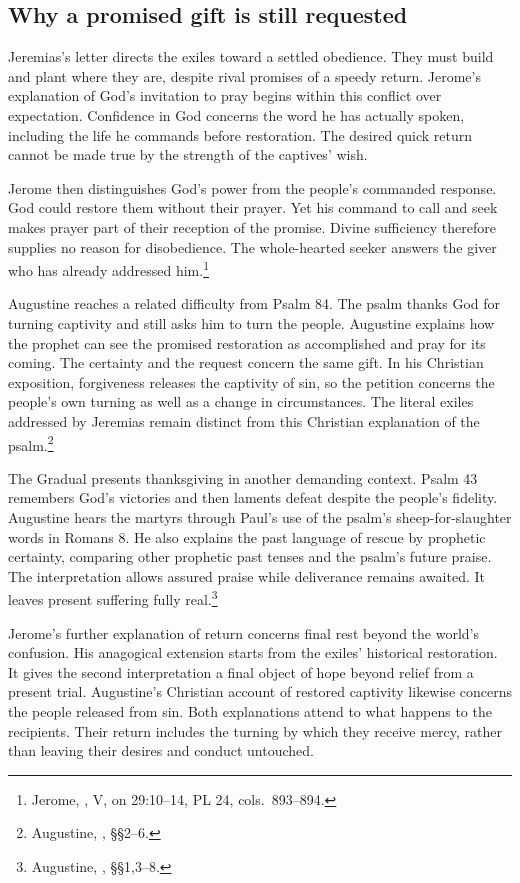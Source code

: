 \subsection{Why a promised gift is still requested}
Jeremias's letter directs the exiles toward a settled obedience.
They must build and plant where they are, despite rival promises
of a speedy return. Jerome's explanation of God's invitation to
pray begins within this conflict over expectation. Confidence in
God concerns the word he has actually spoken, including the life
he commands before restoration. The desired quick return cannot
be made true by the strength of the captives' wish.

Jerome then distinguishes God's power from the people's commanded
response. God could restore them without their prayer. Yet his
command to call and seek makes prayer part of their reception of
the promise. Divine sufficiency therefore supplies no reason for
disobedience. The whole-hearted seeker answers the giver who has
already addressed him.\footnote{Jerome, ,
V, on 29:10--14, PL 24, cols.~893--894.}

Augustine reaches a related difficulty from Psalm 84. The psalm
thanks God for turning captivity and still asks him to turn the
people. Augustine explains how the prophet can see the promised
restoration as accomplished and pray for its coming. The certainty
and the request concern the same gift. In his Christian exposition,
forgiveness releases the captivity of sin, so the petition concerns
the people's own turning as well as a change in circumstances.
The literal exiles addressed by Jeremias remain distinct from this
Christian explanation of the psalm.\footnote{Augustine,
, §§2--6.}

The Gradual presents thanksgiving in another demanding context.
Psalm 43 remembers God's victories and then laments defeat despite
the people's fidelity. Augustine hears the martyrs through Paul's
use of the psalm's sheep-for-slaughter words in Romans 8. He also
explains the past language of rescue by prophetic certainty,
comparing other prophetic past tenses and the psalm's future praise.
The interpretation allows assured praise while deliverance remains
awaited. It leaves present suffering fully real.\footnote{Augustine,
, §§1,3--8.}

Jerome's further explanation of return concerns final rest beyond
the world's confusion. His anagogical extension starts from the
exiles' historical restoration. It gives the second interpretation
a final object of hope beyond relief from a present trial. Augustine's
Christian account of restored captivity likewise concerns the people
released from sin. Both explanations attend to what happens to the
recipients. Their return includes the turning by which they receive
mercy, rather than leaving their desires and conduct untouched.

